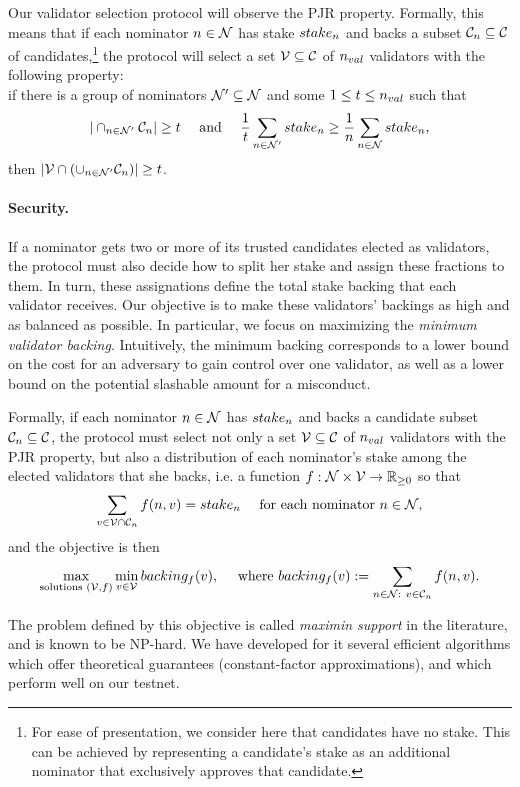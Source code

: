 Our validator selection protocol will observe the PJR property. 
Formally, this means that if each nominator $n \in \mathcal{N}$ has stake $stake_{n}$ and backs a subset 
$\mathcal{C}_{n}\subseteq \mathcal{C}$ of candidates,\footnote{For ease of presentation, we consider here 
that candidates have no stake. This can be achieved by representing a candidate's stake 
as an additional nominator that exclusively approves that candidate.} 
the protocol will select a set $\mathcal{V}\subseteq \mathcal{C}$ of $n_{val}$ validators with the following property: \\
if there is a group of nominators $\mathcal{N}'\subseteq \mathcal{N}$ and some $1\leq t\leq n_{val}$ such that 
$$|\cap_{n\in \mathcal{N}'} \mathcal{C}_n| \geq t \quad \text{ and } \quad  
\frac{1}{t} \sum_{n\in \mathcal{N}'} stake_{n} \geq \frac{1}{n} \sum_{n\in \mathcal{N}} stake_{n},$$
then $|\mathcal{V}\cap (\cup_{n\in\mathcal{N}'} \mathcal{C}_n)| \geq t$.

\paragraph{Security.} If a nominator gets two or more of its trusted candidates elected as validators, 
the protocol must also decide how to split her stake and assign these fractions to them. 
In turn, these assignations define the total stake backing that each validator receives.
Our objective is to make these validators' backings as high and as balanced as possible. 
In particular, we focus on maximizing the \emph{minimum validator backing}. 
Intuitively, the minimum backing corresponds to a lower bound on the cost for an adversary to gain control 
over one validator, as well as a lower bound on the potential slashable amount for a misconduct.

Formally, if each nominator $n \in \mathcal{N}$ has $stake_{n}$ and backs a candidate subset $\mathcal{C}_{n}\subseteq \mathcal{C}$,  
the protocol must select not only a set $\mathcal{V}\subseteq \mathcal{C}$ of $n_{val}$ validators 
with the PJR property, but also a distribution of each nominator's stake among the elected validators that she backs, 
i.e. a function $f:\mathcal{N}\times\mathcal{V} \rightarrow \mathbb{R}_{\geq 0}$ so that 
$$\sum_{v\in \mathcal{V}\cap \mathcal{C}_{n}} f(n, v) = stake_{n} \quad \text{ for each nominator } n\in\mathcal{N},$$
and the objective is then
$$\max_{\text{solutions } (\mathcal{V}, f)} \min_{v\in \mathcal{V}} backing_f(v), 
\quad \text{ where } backing_f(v) := \sum_{n\in \mathcal{N}: \ v\in \mathcal{C}_{n}} f(n, v). $$ 

The problem defined by this objective is called \emph{maximin support} in the literature, and is known to be NP-hard. 
We have developed for it several efficient algorithms which offer theoretical guarantees 
(constant-factor approximations), and which perform well on our testnet. 

